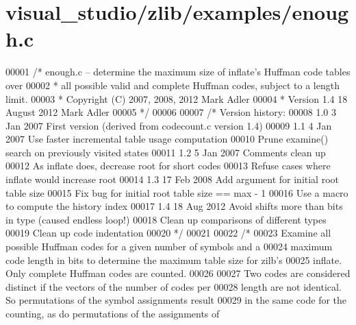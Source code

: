 \hypertarget{visual__studio_2zlib_2examples_2enough_8c_source}{}\section{visual\+\_\+studio/zlib/examples/enough.c}
\label{visual__studio_2zlib_2examples_2enough_8c_source}

\begin{DoxyCode}
00001 \textcolor{comment}{/* enough.c -- determine the maximum size of inflate's Huffman code tables over}
00002 \textcolor{comment}{ * all possible valid and complete Huffman codes, subject to a length limit.}
00003 \textcolor{comment}{ * Copyright (C) 2007, 2008, 2012 Mark Adler}
00004 \textcolor{comment}{ * Version 1.4  18 August 2012  Mark Adler}
00005 \textcolor{comment}{ */}
00006 
00007 \textcolor{comment}{/* Version history:}
00008 \textcolor{comment}{   1.0   3 Jan 2007  First version (derived from codecount.c version 1.4)}
00009 \textcolor{comment}{   1.1   4 Jan 2007  Use faster incremental table usage computation}
00010 \textcolor{comment}{                     Prune examine() search on previously visited states}
00011 \textcolor{comment}{   1.2   5 Jan 2007  Comments clean up}
00012 \textcolor{comment}{                     As inflate does, decrease root for short codes}
00013 \textcolor{comment}{                     Refuse cases where inflate would increase root}
00014 \textcolor{comment}{   1.3  17 Feb 2008  Add argument for initial root table size}
00015 \textcolor{comment}{                     Fix bug for initial root table size == max - 1}
00016 \textcolor{comment}{                     Use a macro to compute the history index}
00017 \textcolor{comment}{   1.4  18 Aug 2012  Avoid shifts more than bits in type (caused endless loop!)}
00018 \textcolor{comment}{                     Clean up comparisons of different types}
00019 \textcolor{comment}{                     Clean up code indentation}
00020 \textcolor{comment}{ */}
00021 
00022 \textcolor{comment}{/*}
00023 \textcolor{comment}{   Examine all possible Huffman codes for a given number of symbols and a}
00024 \textcolor{comment}{   maximum code length in bits to determine the maximum table size for zilb's}
00025 \textcolor{comment}{   inflate.  Only complete Huffman codes are counted.}
00026 \textcolor{comment}{}
00027 \textcolor{comment}{   Two codes are considered distinct if the vectors of the number of codes per}
00028 \textcolor{comment}{   length are not identical.  So permutations of the symbol assignments result}
00029 \textcolor{comment}{   in the same code for the counting, as do permutations of the assignments of}

\end{DoxyCode}
